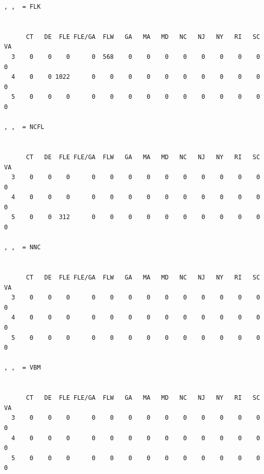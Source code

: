 \documentclass[
  letterpaper,
  oneside,
  open=any]{scrbook}
\newenvironment{Shaded}{\begin{snugshade}}{\end{snugshade}}
\newcommand{\CommentTok}[1]{\textcolor[rgb]{0.37,0.37,0.37}{#1}}
\newcommand{\FunctionTok}[1]{\textcolor[rgb]{0.28,0.35,0.67}{#1}}
\newcommand{\NormalTok}[1]{\textcolor[rgb]{0.00,0.23,0.31}{#1}}
\newcommand{\SpecialCharTok}[1]{\textcolor[rgb]{0.37,0.37,0.37}{#1}}
\begin{document}
\begin{verbatim}
, ,  = FLK

   
      CT   DE  FLE FLE/GA  FLW   GA   MA   MD   NC   NJ   NY   RI   SC   VA
  3    0    0    0      0  568    0    0    0    0    0    0    0    0    0
  4    0    0 1022      0    0    0    0    0    0    0    0    0    0    0
  5    0    0    0      0    0    0    0    0    0    0    0    0    0    0

, ,  = NCFL

   
      CT   DE  FLE FLE/GA  FLW   GA   MA   MD   NC   NJ   NY   RI   SC   VA
  3    0    0    0      0    0    0    0    0    0    0    0    0    0    0
  4    0    0    0      0    0    0    0    0    0    0    0    0    0    0
  5    0    0  312      0    0    0    0    0    0    0    0    0    0    0

, ,  = NNC

   
      CT   DE  FLE FLE/GA  FLW   GA   MA   MD   NC   NJ   NY   RI   SC   VA
  3    0    0    0      0    0    0    0    0    0    0    0    0    0    0
  4    0    0    0      0    0    0    0    0    0    0    0    0    0    0
  5    0    0    0      0    0    0    0    0    0    0    0    0    0    0

, ,  = VBM

   
      CT   DE  FLE FLE/GA  FLW   GA   MA   MD   NC   NJ   NY   RI   SC   VA
  3    0    0    0      0    0    0    0    0    0    0    0    0    0    0
  4    0    0    0      0    0    0    0    0    0    0    0    0    0    0
  5    0    0    0      0    0    0    0    0    0    0    0    0    0    0
\end{verbatim}

\begin{Shaded}
\end{Shaded}
\end{document}
